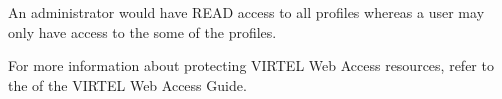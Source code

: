 \documentclass[letterpaper,10pt,english]{sphinxmanual}
\begin{document}
\begin{sphinxVerbatim}[commandchars=\\\{\}]
       
    
\end{sphinxVerbatim}

An administrator would have READ access to all profiles whereas a user may only have access to the some of the profiles.

For more information about protecting VIRTEL Web Access resources, refer to the  of the VIRTEL Web Access Guide.
\end{document}
